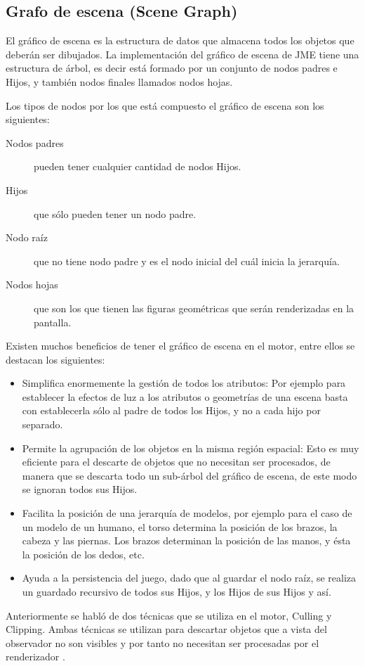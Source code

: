 \documentclass[a4paper,12pt,openany,oneside]{book}
\begin{document}
\subsection{Grafo de escena (Scene Graph)}
El gráfico de escena es la estructura de datos que almacena todos los objetos que deberán ser dibujados. La implementación del gráfico de escena de JME tiene una estructura de árbol, es decir está formado por un conjunto de nodos padres e Hijos, y también nodos finales llamados nodos hojas.

Los tipos de nodos por los que está compuesto el gráfico de escena son los siguientes:
\begin{description}
\item[Nodos padres] pueden tener cualquier cantidad de nodos Hijos. 
\item[Hijos] que sólo pueden tener un nodo padre.
\item[Nodo raíz] que no tiene nodo padre y es el nodo inicial del cuál inicia la jerarquía.
\item[Nodos hojas] que son los que tienen las figuras geométricas que serán renderizadas en la pantalla.
\end{description}
Existen muchos beneficios de tener el gráfico de escena en el motor, entre ellos se destacan los siguientes:
\begin{itemize}
\item Simplifica enormemente la gestión de todos los atributos: Por ejemplo para establecer la efectos de luz a los atributos o geometrías de una escena basta con establecerla sólo al padre de todos los Hijos, y no a cada hijo por separado.
\item Permite la agrupación de los objetos en la misma región espacial: Esto es muy eficiente para el descarte de objetos que no necesitan ser procesados, de manera que se descarta todo un sub-árbol del gráfico de escena, de este modo se ignoran todos sus Hijos. 
\item Facilita la posición de una jerarquía de modelos, por ejemplo para el caso de un modelo de un humano, el torso determina la posición de los brazos, la cabeza y las piernas. Los brazos determinan la posición de las manos, y ésta la posición de los dedos, etc. 
\item Ayuda a la persistencia del juego, dado que al guardar el nodo raíz, se realiza un guardado recursivo de todos sus Hijos, y los Hijos de sus Hijos y así.
\end{itemize}
Anteriormente se habló de dos técnicas que se utiliza en el motor, Culling y Clipping. Ambas técnicas se utilizan para descartar objetos que a vista del observador no son visibles y por tanto no necesitan ser procesadas por el renderizador \cite{BEGINNERS}.
\end{document}
